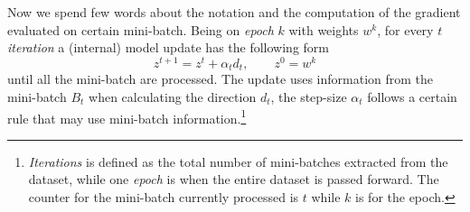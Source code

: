 Now we spend few words about the notation and the computation of the gradient evaluated on certain mini-batch. Being on \emph{epoch} $k$ with weights $w^k$, for every $t$ \emph{iteration} a (internal) model update has the following form
\begin{equation}\label{eq:sgd-step}
z^{t+1}=z^t+\alpha_td_t,\qquad z^0=w^k
\end{equation}
until all the mini-batch are processed. The update uses information from the mini-batch $B_t$ when calculating the direction $d_t$, the step-size $\alpha_t$ follows a certain rule that may use mini-batch information.\footnote{\emph{Iterations} is defined as the total number of mini-batches extracted from the dataset, while one \emph{epoch} is when the entire dataset is passed forward. The counter for the mini-batch currently processed is $t$ while $k$ is for the epoch.}


